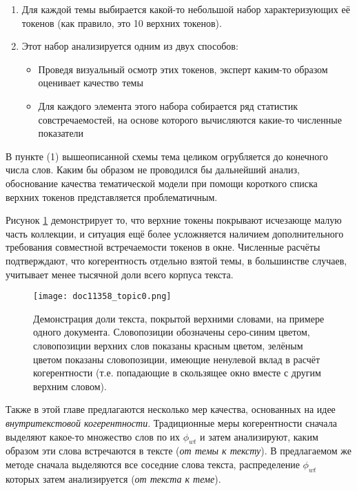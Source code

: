 \begin{enumerate}
    \item Для каждой темы выбирается какой-то небольшой набор характеризующих её токенов (как правило, это 10 верхних токенов).
    \item{Этот набор анализируется одним из двух способов:
    \begin{itemize}
        \item Проведя визуальный осмотр этих токенов, эксперт каким-то образом оценивает качество темы
        \item Для каждого элемента этого набора собирается ряд статистик совстречаемостей, на основе которого вычисляются какие-то численные показатели
    \end{itemize}
    }
\end{enumerate}

В пункте (1) вышеописанной схемы тема целиком огрубляется до конечного числа слов. Каким бы образом не проводился бы дальнейший анализ, обоснование качества тематической модели
при помощи короткого списка верхних токенов представляется проблематичным.

Рисунок \ref{fig:ch3_doc_compound_auto} демонстрирует то, что верхние токены покрывают исчезающе малую часть коллекции, и ситуация ещё более усложняется наличием дополнительного требования совместной встречаемости токенов в окне. Численные расчёты подтверждают, что когерентность отдельно взятой темы, в большинстве случаев, учитывает менее тысячной доли всего корпуса текста.

\begin{figure}
        \texttt{[image: doc11358\_topic0.png]} %
    \captionsetup{justification=raggedright,singlelinecheck=false,format=hang}
    \caption{Демонстрация доли текста, покрытой верхними словами, на примере одного документа. Словопозиции обозначены серо-синим цветом, словопозиции верхних слов показаны красным цветом, зелёным цветом показаны словопозиции, имеющие ненулевой вклад в расчёт когерентности (т.е. попадающие в скользящее окно вместе с другим верхним словом).}
\label{fig:ch3_doc_compound_auto}
\end{figure}

Также в этой главе предлагаются несколько мер качества, основанных на идее \textit{внутритекстовой когерентности}.
Традиционные меры когерентности сначала выделяют какое-то множество слов по их $\phi_{wt}$ и затем анализируют, каким образом эти слова встречаются в тексте (\emph{от темы к тексту}). В предлагаемом же методе сначала выделяются все соседние слова текста, распределение $\phi_{wt}$ которых затем анализируется (\emph{от текста к теме}).

